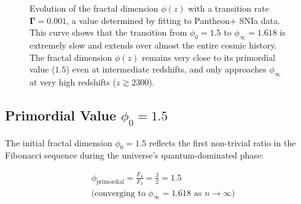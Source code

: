 \documentclass[aps,prl,twocolumn,groupedaddress]{revtex4-2}
\begin{document}
\begin{figure}[htbp!] %
\centering
{}
\caption{Evolution of the fractal dimension $\phi(z)$ with a transition rate $\mathbf{\Gamma=0.001}$, a value determined by fitting to Pantheon+ SNIa data. This curve shows that the transition from $\phi_0=1.5$ to $\phi_\infty=1.618$ is extremely slow and extends over almost the entire cosmic history. The fractal dimension $\phi(z)$ remains very close to its primordial value ($1.5$) even at intermediate redshifts, and only approaches $\phi_\infty$ at very high redshifts ($z \gtrsim 2300$).}
\end{figure}

\subsection{Primordial Value $\phi_0 = 1.5$}
\label{sec:phi_primordial}

The initial fractal dimension $\phi_0 = 1.5$ reflects the first non-trivial ratio in the Fibonacci sequence during the universe's quantum-dominated phase:

\begin{equation}
\begin{aligned}
&\phi_{\text{primordial}} = \frac{F_4}{F_3} = \frac{3}{2} = 1.5 \\
&\text{(converging to } \phi_\infty = 1.618 \text{ as } n \to \infty\text{)}
\end{aligned}
\end{equation}
\end{document}
